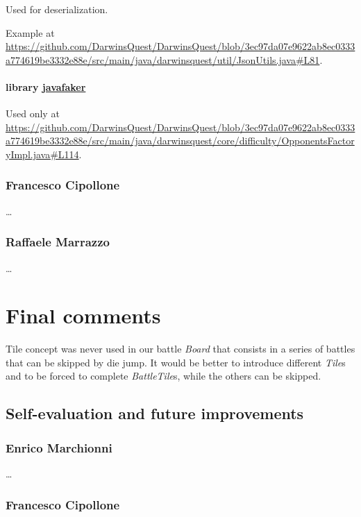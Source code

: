 \documentclass[12pt, a4paper]{report}
\begin{document}
        Used for deserialization.

        Example at \url{https://github.com/DarwinsQuest/DarwinsQuest/blob/3ec97da07e9622ab8ec0333a774619be3332e88e/src/main/java/darwinsquest/util/JsonUtils.java#L81}.
        
        \subsubsection{library \href{https://github.com/DiUS/java-faker}{javafaker}}
        
        Used only at \url{https://github.com/DarwinsQuest/DarwinsQuest/blob/3ec97da07e9622ab8ec0333a774619be3332e88e/src/main/java/darwinsquest/core/difficulty/OpponentsFactoryImpl.java#L114}.

    \subsection*{Francesco Cipollone}

    \dots

    \subsection*{Raffaele Marrazzo}

    \dots

\chapter{Final comments}

    Tile concept was never used in our battle \emph{Board} that consists in a series of battles that can be skipped by die jump.
    It would be better to introduce different \emph{Tile}s and to be forced to complete \emph{BattleTile}s, while the others can be skipped.

\section{Self-evaluation and future improvements}

    \subsection*{Enrico Marchionni}
    
    \dots

    \subsection*{Francesco Cipollone}
\end{document}
